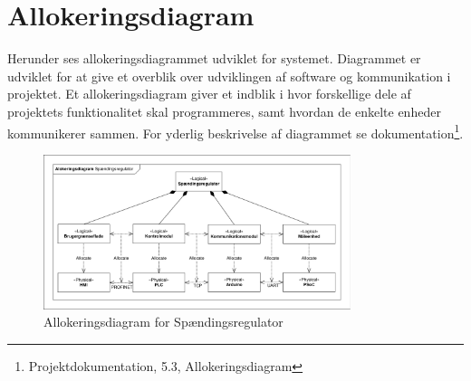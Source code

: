 

\section{Allokeringsdiagram}

Herunder ses allokeringsdiagrammet udviklet for systemet. Diagrammet er udviklet for at give et overblik over udviklingen af software og kommunikation i projektet. Et allokeringsdiagram giver et indblik i hvor forskellige dele af projektets funktionalitet skal programmeres, samt hvordan de enkelte enheder kommunikerer sammen. For yderlig beskrivelse af diagrammet se dokumentation\footnote{Projektdokumentation, 5.3, Allokeringsdiagram}.


\begin{figure}[htbp] %
	\centering
	\includegraphics[width=0.8\textwidth]{figure/Allokering.pdf}
	\caption{Allokeringsdiagram for Spændingsregulator}
	\label{fig:Allokering}
\end{figure}